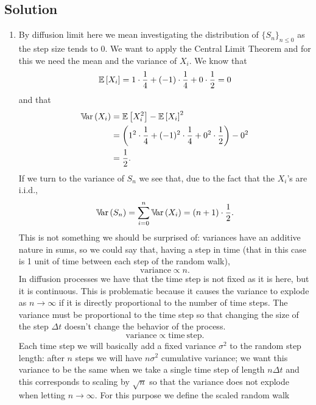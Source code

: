 \documentclass[12pt]{article}
\begin{document}
	\subsection*{Solution}
	\begin{enumerate}
		\item By diffusion limit here we mean investigating the distribution of ${\{S_{n}\}}_{n\leq0}$ as the step size tends to 0. We want to apply the Central Limit Theorem and for this we need the mean and the variance of $X_i$.
		We know that
		\begin{equation*}
			\mathbb{E}\left[{X_{i}}\right]=1\cdot\frac{1}{4}+(-1)\cdot\frac{1}{4}+0\cdot\frac{1}{2}=0
		\end{equation*}
		and that
		\begin{align*}
			\mathbb{V}\!\mathrm{ar}\,(X_{i})&=\mathbb{E}\left[X_{i}^{2}\right]-\mathbb{E}\left[X_{i}\right]^{2}\\
			&=\left(1^{2}\cdot\frac{1}{4}+(-1)^{2}\cdot\frac{1}{4}+0^{2}\cdot\frac{1}{2}\right)-0^{2}\\
			&=\frac{1}{2}.
		\end{align*}
		If we turn to the variance of $S_{n}$ we see that, due to the fact that the $X_{i}$'s are i.i.d., 
		\begin{equation*}
			\mathbb{V}\!\mathrm{ar}\,(S_{n})=\sum_{i=0}^{n}\mathbb{V}\!\mathrm{ar}\,(X_{i})=(n+1)\cdot\frac{1}{2}.
		\end{equation*}
		This is not something we should be surprised of: variances have an additive nature in sums, so we could say that, having a step in time (that in this case is 1 unit of time between each step of the random walk),
		\begin{equation*}
			\mathrm{variance}\propto n.
		\end{equation*}
		In diffusion processes we have that the time step is not fixed as it is here, but it is continuous. This is problematic because it causes the variance to explode as $n\to\infty$ if it is directly proportional to the number of time steps. The variance must be proportional to the time step so that changing the size of the step $\Delta t$ doesn't change the behavior of the process.
		\begin{equation*}
			\mathrm{variance}\propto \mathrm{time~step}.
		\end{equation*}
		Each time step we will basically add a fixed variance $\sigma^{2}$ to the random step length: after $n$ steps we will have $n\sigma^{2}$ cumulative variance; we want this variance to be the same when we take a single time step of length $n\Delta t$ and this corresponds to scaling by $\sqrt{n}$ so that the variance does not explode when letting $n\to\infty$. For this purpose we define the scaled random walk

\end{enumerate}
\end{document}
